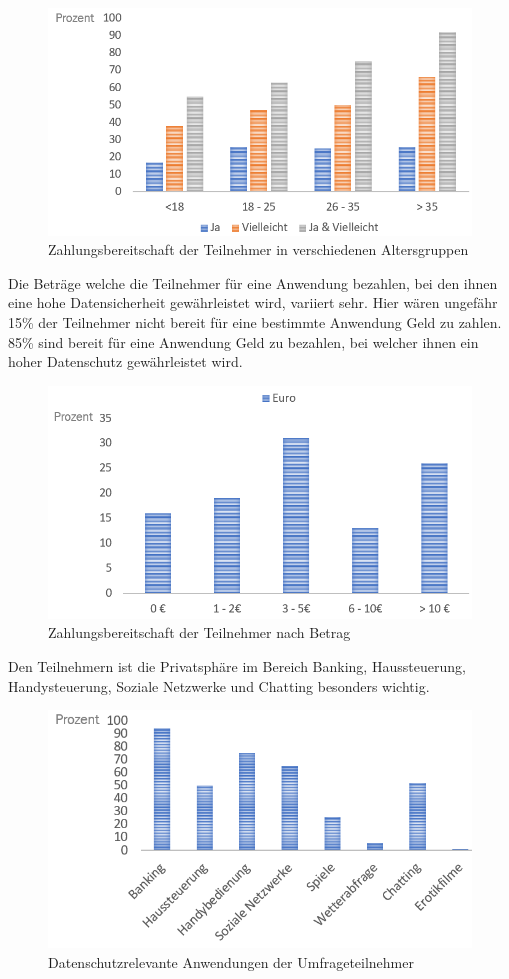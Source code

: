 \begin{figure}[h!]
	\centering
	\includegraphics[width=0.7\linewidth]{Picture/umfrage_geld_gruppen}
	\caption[Zahlungsbereitschaft der Teilnehmer in verschiedenen Altersgruppen]{Zahlungsbereitschaft der Teilnehmer in verschiedenen Altersgruppen}
	\label{fig:umfrage_geld_gruppen}
\end{figure}

Die Beträge welche die Teilnehmer für eine Anwendung bezahlen, bei den ihnen eine hohe Datensicherheit gewährleistet wird, variiert sehr. Hier wären ungefähr 15\% der Teilnehmer nicht bereit für eine bestimmte Anwendung Geld zu zahlen. 85\% sind bereit für eine Anwendung Geld zu bezahlen, bei welcher ihnen ein hoher Datenschutz gewährleistet wird. 

\begin{figure}[h!]
	\centering
	\includegraphics[width=0.7\linewidth]{Picture/umfrage_betrag}
	\caption[Zahlungsbereitschaft der Teilnehmer nach Betrag]{Zahlungsbereitschaft der Teilnehmer nach Betrag}
	\label{fig:umfrage_betrag}
\end{figure}

Den Teilnehmern ist die Privatsphäre im Bereich Banking, Haussteuerung, Handysteuerung, Soziale Netzwerke und Chatting besonders wichtig. 


\begin{figure}[h!]
	\centering
	\includegraphics[width=0.7\linewidth]{Picture/umfrage_anwendung}
	\caption[Datenschutzrelevante Anwendungen der Umfrageteilnehmers]{Datenschutzrelevante Anwendungen der Umfrageteilnehmer}
	\label{fig:umfrage_anwendung}
\end{figure}

